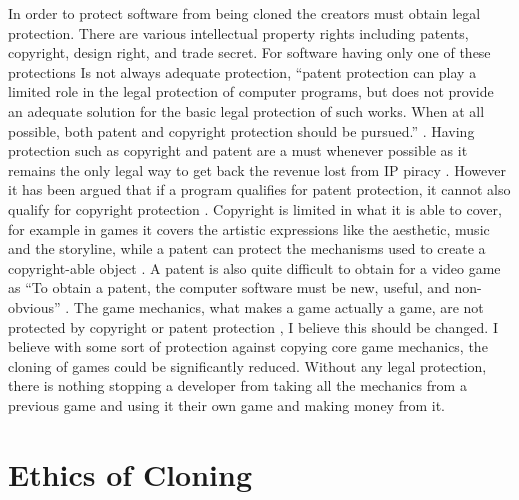 \documentclass{scrartcl}
\begin{document}
In order to protect software from being cloned the creators must obtain legal protection. There are various intellectual property rights including patents, copyright, design right, and trade secret. For software having only one of these protections Is not always adequate protection, ``patent protection can play a limited role in the legal protection of computer programs, but does not provide an adequate solution for the basic legal protection of such works. When at all possible, both patent and copyright protection should be pursued.'' \cite{Current}. Having protection such as copyright and patent are a must whenever possible as it remains the only legal way to get back the revenue lost from IP piracy \cite{20yearsIP}. However it has been argued that if a program qualifies for patent protection, it cannot also qualify for copyright protection \cite{Current}. Copyright is limited in what it is able to cover, for example in games it covers the artistic expressions like the aesthetic, music and the storyline, while a patent can protect the mechanisms used to create a copyright-able object \cite{LegalJuridical}. A patent is also quite difficult to obtain for a video game as ``To obtain a patent, the computer software
must be new, useful, and non-obvious'' \cite{ThouShaltNot}. The game mechanics, what makes a game actually a game, are not protected by copyright or patent protection \cite{ClonedAtBirth}, I believe this should be changed. I believe with some sort of protection against copying core game mechanics, the cloning of games could be significantly reduced. Without any legal protection, there is nothing stopping a developer from taking all the mechanics from a previous game and using it their own game and making money from it. 

\section*{Ethics of Cloning}
\end{document}
